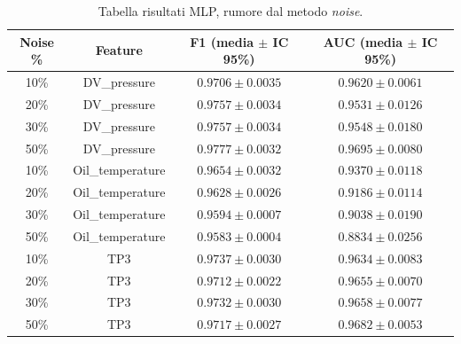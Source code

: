 \documentclass[../main.tex]{subfiles}
\begin{document}
\begin{table}[H]
\centering\small
{}
\begin{tabular}{cccc}
\toprule
\textbf{Noise \%} & \textbf{Feature} & \textbf{F1 (media $\pm$ IC 95\%)} & \textbf{AUC (media $\pm$ IC 95\%)} \\
\midrule
10\% & DV\_pressure     & $0.9706 \pm 0.0035$ & $0.9620 \pm 0.0061$ \\
20\% & DV\_pressure     & $0.9757 \pm 0.0034$ & $0.9531 \pm 0.0126$ \\
30\% & DV\_pressure     & $0.9757 \pm 0.0034$ & $0.9548 \pm 0.0180$ \\
50\% & DV\_pressure     & $0.9777 \pm 0.0032$ & $0.9695 \pm 0.0080$ \\
\midrule
10\% & Oil\_temperature & $0.9654 \pm 0.0032$ & $0.9370 \pm 0.0118$ \\
20\% & Oil\_temperature & $0.9628 \pm 0.0026$ & $0.9186 \pm 0.0114$ \\
30\% & Oil\_temperature & $0.9594 \pm 0.0007$ & $0.9038 \pm 0.0190$ \\
50\% & Oil\_temperature & $0.9583 \pm 0.0004$ & $0.8834 \pm 0.0256$ \\
\midrule
10\% & TP3             & $0.9737 \pm 0.0030$ & $0.9634 \pm 0.0083$ \\
20\% & TP3             & $0.9712 \pm 0.0022$ & $0.9655 \pm 0.0070$ \\
30\% & TP3             & $0.9732 \pm 0.0030$ & $0.9658 \pm 0.0077$ \\
50\% & TP3             & $0.9717 \pm 0.0027$ & $0.9682 \pm 0.0053$ \\
\bottomrule
\end{tabular}
\caption{Tabella risultati MLP, rumore dal metodo \textit{noise}.}
\label{tab:mlp_noise}
\end{table}
\end{document}
